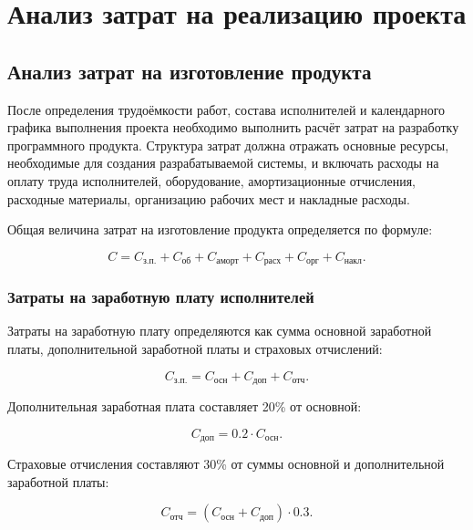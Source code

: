 \section{Анализ затрат на реализацию проекта}

\subsection{Анализ затрат на изготовление продукта}

После определения трудоёмкости работ, состава исполнителей и
календарного графика выполнения проекта необходимо выполнить расчёт
затрат на разработку программного продукта. Структура затрат должна
отражать основные ресурсы, необходимые для создания разрабатываемой
системы, и включать расходы на оплату труда исполнителей,
оборудование, амортизационные отчисления, расходные материалы,
организацию рабочих мест и накладные расходы.

Общая величина затрат на изготовление продукта определяется по
формуле:

\begin{equation}
C = C_{\text{з.п.}} + C_{\text{об}} + C_{\text{аморт}} +
C_{\text{расх}} + C_{\text{орг}} + C_{\text{накл}}.
\end{equation}

\subsubsection*{Затраты на заработную плату исполнителей}

Затраты на заработную плату определяются как сумма основной
заработной платы, дополнительной заработной платы и страховых
отчислений:

\begin{equation}
C_{\text{з.п.}} = C_{\text{осн}} + C_{\text{доп}} + C_{\text{отч}}.
\end{equation}

Дополнительная заработная плата составляет 20\% от основной:

\begin{equation}
C_{\text{доп}} = 0.2 \cdot C_{\text{осн}}.
\end{equation}

Страховые отчисления составляют 30\% от суммы основной и
дополнительной заработной платы:

\begin{equation}
C_{\text{отч}} = (C_{\text{осн}} + C_{\text{доп}})\cdot 0.3.
\end{equation}

